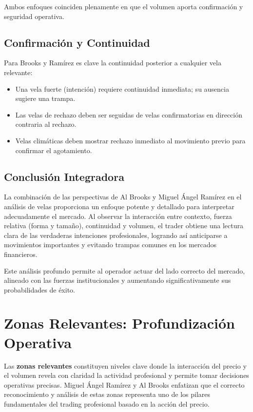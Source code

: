 Ambos enfoques coinciden plenamente en que el volumen aporta confirmaci\'on y seguridad operativa.

\subsection{Confirmaci\'on y Continuidad}

Para Brooks y Ram\'irez es clave la continuidad posterior a cualquier vela relevante:

\begin{itemize}
    \item Una vela fuerte (intenci\'on) requiere continuidad inmediata; su ausencia sugiere una trampa.
    \item Las velas de rechazo deben ser seguidas de velas confirmatorias en direcci\'on contraria al rechazo.
    \item Velas clim\'aticas deben mostrar rechazo inmediato al movimiento previo para confirmar el agotamiento.
\end{itemize}

\subsection{Conclusi\'on Integradora}

La combinaci\'on de las perspectivas de Al Brooks y Miguel \'Angel Ram\'irez en el an\'alisis de velas proporciona un enfoque potente y detallado para interpretar adecuadamente el mercado. Al observar la interacci\'on entre contexto, fuerza relativa (forma y tama\~no), continuidad y volumen, el trader obtiene una lectura clara de las verdaderas intenciones profesionales, logrando as\'i anticiparse a movimientos importantes y evitando trampas comunes en los mercados financieros.

Este an\'alisis profundo permite al operador actuar del lado correcto del mercado, alineado con las fuerzas institucionales y aumentando significativamente sus probabilidades de \'exito.

\section{Zonas Relevantes: Profundizaci\'on Operativa}

Las \textbf{zonas relevantes} constituyen niveles clave donde la interacci\'on del precio y el volumen revela con claridad la actividad profesional y permite tomar decisiones operativas precisas. Miguel \'Angel Ram\'irez y Al Brooks enfatizan que el correcto reconocimiento y an\'alisis de estas zonas representa uno de los pilares fundamentales del trading profesional basado en la acci\'on del precio.

